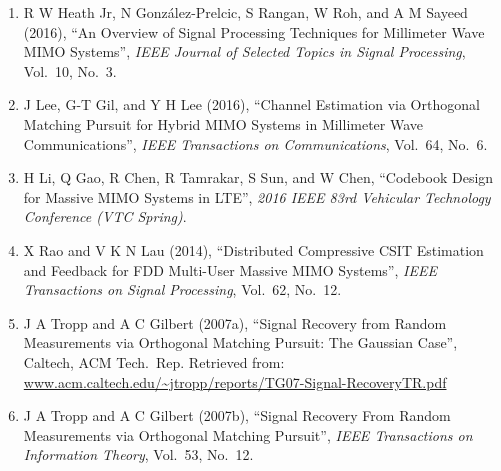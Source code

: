 \documentclass[12pt]{article}
\begin{document}
\begin{enumerate}
\item R W Heath Jr, N González-Prelcic, S Rangan, W Roh, and A M Sayeed (2016), ``An Overview of Signal Processing Techniques for Millimeter Wave MIMO Systems'', \textit{IEEE Journal of Selected Topics in Signal Processing}, Vol.\ 10, No.\ 3.

\item J Lee, G-T Gil, and Y H Lee (2016), ``Channel Estimation via Orthogonal Matching Pursuit for Hybrid MIMO Systems in Millimeter Wave Communications'', \textit{IEEE Transactions on Communications}, Vol.\ 64, No.\ 6.

\item H Li, Q Gao, R Chen, R Tamrakar, S Sun, and W Chen, ``Codebook Design for Massive MIMO Systems in LTE'', \textit{2016 IEEE 83rd Vehicular Technology Conference (VTC Spring)}.

\item X Rao and V K N Lau (2014), ``Distributed Compressive CSIT Estimation and Feedback for FDD Multi-User Massive MIMO Systems'', \textit{IEEE Transactions on Signal Processing}, Vol.\ 62, No.\ 12.

\item J A Tropp and A C Gilbert (2007a), ``Signal Recovery from Random Measurements via Orthogonal Matching Pursuit: The Gaussian Case'', Caltech, ACM Tech.\ Rep. Retrieved from: \url{www.acm.caltech.edu/~jtropp/reports/TG07-Signal-RecoveryTR.pdf}

\item J A Tropp and A C Gilbert (2007b), ``Signal Recovery From Random Measurements via Orthogonal Matching Pursuit'', \textit{IEEE Transactions on Information Theory}, Vol.\ 53, No.\ 12.


\end{enumerate}
\end{document}
